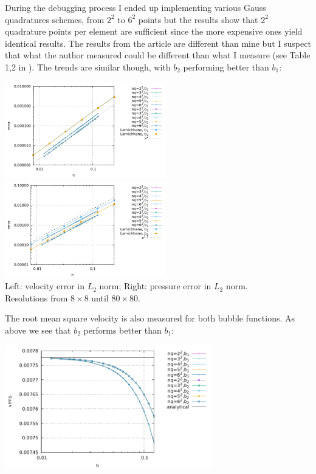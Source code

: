 During the debugging process I ended up 
implementing various Gauss quadratures schemes, from $2^2$ to $6^2$ points but the results
show that $2^2$ quadrature points per element are sufficient since the more expensive ones
yield identical results. 
The results from the article are different than mine but I suspect that what the 
author measured could be different than what I measure (see Table 1,2 in \cite{lami17}). 
The trends are similar though, with $b_2$ performing better than $b_1$:

\begin{center}
\includegraphics[width=7cm]{python_codes/fieldstone_72/results/mms/errors_v}
\includegraphics[width=7cm]{python_codes/fieldstone_72/results/mms/errors_p}\\
{\captionfont Left: velocity error in $L_2$ norm; Right: pressure error in $L_2$ norm.\\
Resolutions from $8\times8$ until $80\times80$.}
\end{center}

The root mean square velocity is also measured for both bubble functions.
As above we see that $b_2$ performs better than $b_1$:
\begin{center}
\includegraphics[width=9cm]{python_codes/fieldstone_72/results/mms/vrms}
\end{center}

